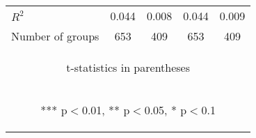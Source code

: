 \documentclass[]{standalone}
\begin{document}
\begin{tabular}{lcccc}
    $R^2$            & 0.044                                          & 0.008                                          & 0.044                                          & 0.009                                          \\
    Number of groups & 653                                            & 409                                            & 653                                            & 409                                            \\ \hline
    \multicolumn{5}{c}{\begin{footnotesize} t-statistics in parentheses\end{footnotesize}}                                                                                                                               \\
    \multicolumn{5}{c}{\begin{footnotesize} *** p$<$0.01, ** p$<$0.05, * p$<$0.1\end{footnotesize}}                                                                                                                      \\
\end{tabular}
\end{document}
